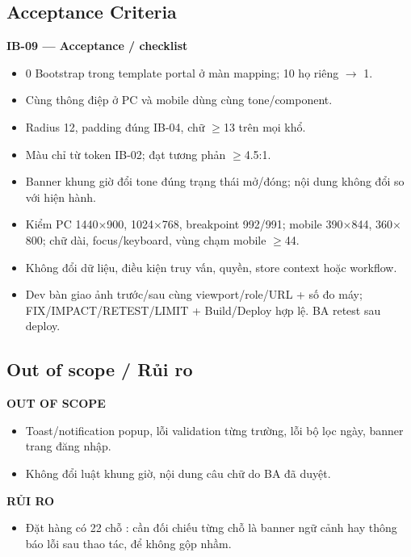 \documentclass[11pt,a4paper]{report}
\begin{document}
\subsection*{Acceptance Criteria}
\par\smallskip\textbf{IB-09 — Acceptance / checklist}\par
\begin{itemize}[label=$\square$]
\item 0 Bootstrap  trong template portal ở màn mapping; 10 họ riêng \(\to\) 1.
\item Cùng thông điệp ở PC và mobile dùng cùng tone/\allowbreak{}component.
\item Radius 12, padding đúng IB-04, chữ \(\geq\)13 trên mọi khổ.
\item Màu chỉ từ token IB-02; đạt tương phản \(\geq\)4.5:1.
\item Banner khung giờ đổi tone đúng trạng thái mở/\allowbreak{}đóng; nội dung không đổi so với hiện hành.
\item Kiểm PC 1440\(\times\)900, 1024\(\times\)768, breakpoint 992/\allowbreak{}991; mobile 390\(\times\)844, 360\(\times\)800; chữ dài, focus/\allowbreak{}keyboard, vùng chạm mobile \(\geq\)44.
\item Không đổi dữ liệu, điều kiện truy vấn, quyền, store context hoặc workflow.
\item Dev bàn giao ảnh trước/\allowbreak{}sau cùng viewport/\allowbreak{}role/\allowbreak{}URL + số đo máy; FIX/\allowbreak{}IMPACT/\allowbreak{}RETEST/\allowbreak{}LIMIT + Build/\allowbreak{}Deploy hợp lệ. BA retest sau deploy.
\end{itemize}
\subsection*{Out of scope / Rủi ro}
\par\smallskip\textbf{OUT OF SCOPE}\par
\begin{itemize}
\item Toast/\allowbreak{}notification popup, lỗi validation từng trường, lỗi bộ lọc ngày, banner trang đăng nhập.
\item Không đổi luật khung giờ, nội dung câu chữ do BA đã duyệt.
\end{itemize}

\par\smallskip\textbf{RỦI RO}\par
\begin{itemize}
\item Đặt hàng có 22 chỗ : cần đối chiếu từng chỗ là banner ngữ cảnh hay thông báo lỗi sau thao tác, để không gộp nhầm.
\end{itemize}
\end{document}
